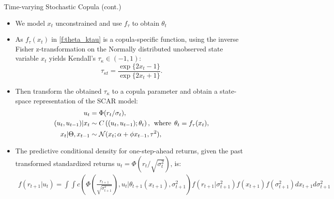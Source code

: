 \documentclass[9pt,xcolor=x11names,compress]{beamer}
\begin{document}
\begin{frame}{Time-varying Stochastic Copula (cont.)}
	\begin{itemize}
		\item We model $x_t$ unconstrained and use $f_{\tau}$ to obtain $\theta_t$
		\item As $f_{\tau}(x_t)$ in \eqref{f:theta_ktau} is a copula-specific function, using the inverse Fisher z-transformation on the Normally distributed unobserved state variable $x_t$ yields Kendall's $\tau_{\kappa} \in (-1,1)$:
		\begin{equation*}
		\tau_{\kappa t} = \frac{\exp\{2x_t-1\}}{\exp\{2x_t+1\}}.
		\end{equation*}
		\item Then transform the obtained $\tau_{\kappa}$ to a copula parameter and obtain a state-space representation of the SCAR model:
		\begin{align}\label{f:scar1}
		\notag
		u_t& = \Phi(r_t/\sigma_t),\\
		(u_t,u_{t-1})|x_t &\sim C\left((u_t,u_{t-1});\theta_t\right),\:\:\text{where}\:\:\theta_t = f_{\tau}(x_t),\\
		x_t|\Theta, x_{t-1} &\sim \mathcal{N}(x_t;\alpha+\phi x_{t-1},\tau^2),\notag
		\end{align}
		\pause
		\item The predictive conditional density for one-step-ahead returns, given the past transformed standardized returns $u_t = \Phi(r_t/\sqrt{\sigma^2_t})$, is:
		{\footnotesize\begin{align*}
			f(r_{t+1}|u_{t}) = \int\int c\left(\Phi\left(\frac{r_{t+1}}{\sqrt{\sigma^2_{t+1}}}\right),u_t|\theta_{t+1}(x_{t+1}), \sigma^2_{t+1}\right)f(r_{t+1}|\sigma^2_{t+1}) f(x_{t+1}) f(\sigma^2_{t+1}) dx_{t+1} d\sigma^2_{t+1}
			\end{align*}}
	\end{itemize}
\end{frame}
\end{document}
